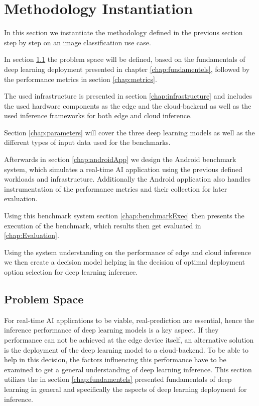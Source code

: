 \chapter{Methodology Instantiation}
\label{chap:experiments}
In this section we instantiate the methodology defined in the previous section step by step on an image classification use case.

In section \ref{chap:problemSpace} the problem space will be defined, based on the fundamentals of deep learning deployment presented in chapter \ref{chap:fundamentels}, followed by the performance metrics in section \ref{chap:metrics}.


The used infrastructure is presented in section \ref{chap:infrastructure} and includes the used hardware components as the edge and the cloud-backend as well as the used inference frameworks for both edge and cloud inference.

Section \ref{chap:parameters} will cover the three deep learning models as well as the different types of input data used for the benchmarks.

Afterwards in section \ref{chap:androidApp} we design the Android benchmark system, which simulates a real-time AI application using the previous defined workloads and infrastructure. Additionally the Android application also handles instrumentation of the performance metrics and their collection for later evaluation.

Using this benchmark system section \ref{chap:benchmarkExec} then presents the execution of the benchmark, which results then get evaluated in \ref{chap:Evaluation}.

Using the system understanding on the performance of edge and cloud inference we then create a decision model helping in the decision of optimal deployment option selection for deep learning inference.


\section{Problem Space}
\label{chap:problemSpace}
For real-time AI applications to be viable, real-prediction are essential, hence the inference performance of deep learning models is a key aspect.
If they performance can not be achieved at the edge device itself, an alternative solution is the deployment of the deep learning model to a cloud-backend.
To be able to help in this decision, the factors influencing this performance have to be examined to get a general understanding of deep learning inference.
This section utilizes the in section \ref{chap:fundamentels} presented fundamentals of deep learning in general and specifically the aspects of deep learning deployment for inference.

